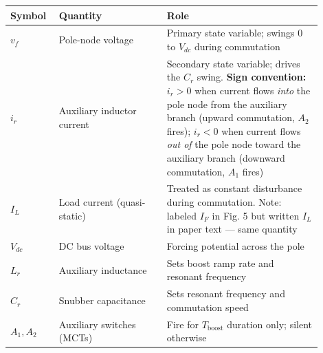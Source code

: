 \documentclass[12pt, a4paper]{article}
\def\,{ }%
\newcommand{\Vdc}{V_{dc}}
\newcommand{\vf}{v_f}
\newcommand{\ir}{i_r}
\newcommand{\IL}{I_L}
\newcommand{\Lr}{L_r}
\newcommand{\Cr}{C_r}
\begin{document}
\begin{statebox}
\renewcommand{\arraystretch}{1.3}
\begin{tabular}{p{0.12\linewidth} p{0.32\linewidth} p{0.46\linewidth}}
\toprule
\textbf{Symbol} & \textbf{Quantity} & \textbf{Role} \\
\midrule
$\vf$      & Pole-node voltage           & Primary state variable; swings 0 to $\Vdc$ during commutation \\
$\ir$      & Auxiliary inductor current  & Secondary state variable; drives the $\Cr$ swing.
\newline\textbf{Sign convention:} $\ir>0$ when current flows \emph{into} the pole node from the auxiliary branch (upward commutation, $A_2$ fires); $\ir<0$ when current flows \emph{out of} the pole node toward the auxiliary branch (downward commutation, $A_1$ fires) \\
$\IL$      & Load current (quasi-static) & Treated as constant disturbance during commutation. Note: labeled $I_F$ in Fig.\,5 but written $I_L$ in paper text — same quantity \\
$\Vdc$     & DC bus voltage              & Forcing potential across the pole \\
$\Lr$      & Auxiliary inductance        & Sets boost ramp rate and resonant frequency \\
$\Cr$      & Snubber capacitance         & Sets resonant frequency and commutation speed \\
$A_1, A_2$ & Auxiliary switches (MCTs)   & Fire for $T_\text{boost}$ duration only; silent otherwise \\
\bottomrule
\end{tabular}
\end{statebox}
\end{document}
